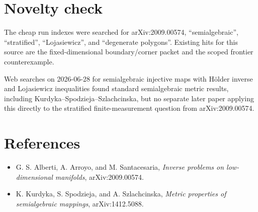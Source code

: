\documentclass[11pt]{article}
\begin{document}
\section{Novelty check}

The cheap run indexes were searched for arXiv:2009.00574, ``semialgebraic'',
``stratified'', ``Lojasiewicz'', and ``degenerate polygons''.  Existing hits for
this source are the fixed-dimensional boundary/corner packet and the scoped
frontier counterexample.

Web searches on 2026-06-28 for semialgebraic injective maps with H\"older
inverse and Lojasiewicz inequalities found standard semialgebraic metric
results, including Kurdyka--Spodzieja--Szlachcinska, but no separate later
paper applying this directly to the stratified finite-measurement question from
arXiv:2009.00574.

\section{References}

\begin{itemize}
\item G. S. Alberti, A. Arroyo, and M. Santacesaria, \emph{Inverse problems on
  low-dimensional manifolds}, arXiv:2009.00574.
\item K. Kurdyka, S. Spodzieja, and A. Szlachcinska, \emph{Metric properties of
  semialgebraic mappings}, arXiv:1412.5088.
\end{itemize}
\end{document}
